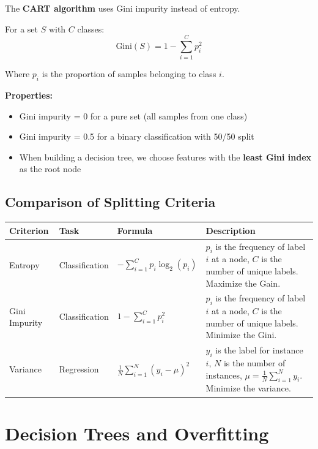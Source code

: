 \documentclass[11pt,a4paper]{article}
\theoremstyle{definition}
\theoremstyle{plain}
\theoremstyle{remark}
\begin{document}
The \textbf{CART algorithm} uses Gini impurity instead of entropy.

\begin{tcolorbox}[colback=blue!5!white,colframe=blue!75!black,title=\textbf{Gini Impurity Formula}]
For a set \(S\) with \(C\) classes:
\[
\text{Gini}(S) = 1 - \sum_{i=1}^{C} p_i^2
\]

Where \(p_i\) is the proportion of samples belonging to class \(i\).
\end{tcolorbox}

\textbf{Properties:}
\begin{itemize}
    \item Gini impurity = 0 for a pure set (all samples from one class)
    \item Gini impurity = 0.5 for a binary classification with 50/50 split
    \item When building a decision tree, we choose features with the \textbf{least Gini index} as the root node
\end{itemize}

\subsection{Comparison of Splitting Criteria}

\begin{center}
\begin{tabular}{|l|l|l|p{6cm}|}
\hline
\textbf{Criterion} & \textbf{Task} & \textbf{Formula} & \textbf{Description} \\
\hline
Entropy & Classification & \(-\sum_{i=1}^{C} p_i \log_2(p_i)\) & \(p_i\) is the frequency of label \(i\) at a node, \(C\) is the number of unique labels. Maximize the Gain. \\
\hline
Gini Impurity & Classification & \(1 - \sum_{i=1}^{C} p_i^2\) & \(p_i\) is the frequency of label \(i\) at a node, \(C\) is the number of unique labels. Minimize the Gini. \\
\hline
Variance & Regression & \(\frac{1}{N} \sum_{i=1}^{N} (y_i - \mu)^2\) & \(y_i\) is the label for instance \(i\), \(N\) is the number of instances, \(\mu = \frac{1}{N} \sum_{i=1}^{N} y_i\). Minimize the variance. \\
\hline
\end{tabular}
\end{center}

\section{Decision Trees and Overfitting}
\end{document}
